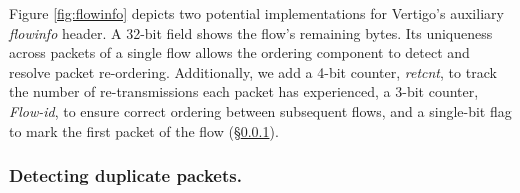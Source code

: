 
Figure \ref{fig:flowinfo} depicts two potential implementations for Vertigo's auxiliary \textit{flowinfo} header.
A 32-bit field shows the flow's remaining bytes. Its uniqueness across packets of a single flow allows the ordering component to detect and resolve packet re-ordering. 
Additionally, we add a 4-bit counter, \textit{retcnt}, to track the number of re-transmissions each packet has experienced, a 3-bit counter, \textit{Flow-id}, to ensure correct ordering between subsequent flows, and a single-bit flag to mark the first packet of the flow (\S\ref{sec:ret}).

\subsubsection{Detecting duplicate packets.}
\label{sec:ret}

